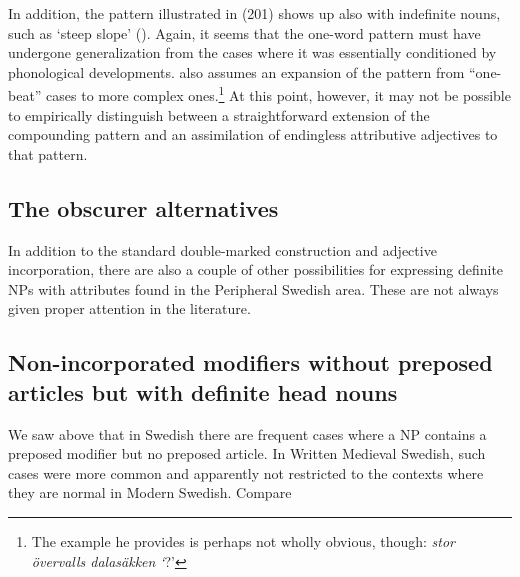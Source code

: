 In addition, the pattern illustrated in (201) shows up also with indefinite nouns, such as  ‘steep slope’ (\citet[52]{Levander1909}). Again, it seems that the one-word pattern must have undergone generalization from the cases where it was essentially conditioned by phonological developments. \citet[103]{Dahlstedt1962} also assumes an expansion of the pattern from “one-beat” cases to more complex ones.\footnote{ The example he provides is perhaps not wholly obvious, though: \textit{stor övervalls dalasäkken }\textit{‘}?’} At this point, however, it may not be possible to empirically distinguish between a straightforward extension of the compounding pattern and an assimilation of endingless attributive adjectives to that pattern. 


\subsection{\rmfamily The obscurer alternatives}
\label{bkm:Ref105224927}
In addition to the standard double-marked construction and adjective incorporation, there are also a couple of other possibilities for expressing definite NPs with attributes found in the Peripheral Swedish area. These are not always given proper attention in the literature. 


\subsection{\rmfamily Non-incorporated modifiers without preposed articles but with definite head nouns}
\label{bkm:Ref154984033}
We saw above that in Swedish there are frequent cases where a NP contains a preposed modifier but no preposed article. In Written Medieval Swedish, such cases were more common and apparently not restricted to the contexts where they are normal in Modern Swedish. Compare 


\item 

